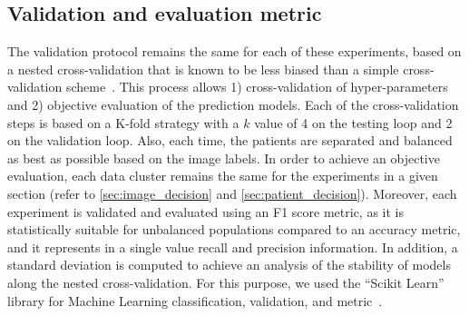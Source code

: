 \documentclass[journal,article,submit,moreauthors,pdftex, applsci]{Definitions/mdpi}
\begin{document}
\subsection{Validation and evaluation metric}
The validation protocol remains the same for each of these experiments, based on a nested cross-validation that is known to be less biased than a simple cross-validation scheme~\cite{Cawley2010}. This process allows 1) cross-validation of hyper-parameters and 2) objective evaluation of the prediction models. Each of the cross-validation steps is based on a K-fold strategy with a $k$ value of 4 on the testing loop and 2 on the validation loop. Also, each time, the patients are separated and balanced as best as possible based on the image labels. In order to achieve an objective evaluation, each data cluster remains the same for the experiments in a given section (refer to \cref{sec:image_decision} and \cref{sec:patient_decision}). Moreover, each experiment is validated and evaluated using an F1 score metric, as it is statistically suitable for unbalanced populations compared to an accuracy metric, and it represents in a single value recall and precision information. In addition, a standard deviation is computed to achieve an analysis of the stability of models along the nested cross-validation. For this purpose, we used the “Scikit Learn” library for Machine Learning classification, validation, and metric~\cite{pedregosa2011scikit}.\par
\end{document}
